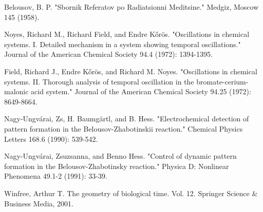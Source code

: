 \documentclass[3p, twocolumn]{elsarticle}
\begin{document}
\begin{thebibliography}{5}
 Belousov, B. P. "Sbornik Referatov po Radiatsionni Meditsine." Medgiz, Moscow 145 (1958).

 Noyes, Richard M., Richard Field, and Endre Kőrös. "Oscillations in chemical systems. I. Detailed mechanism in a system showing temporal oscillations." Journal of the American Chemical Society 94.4 (1972): 1394-1395.

 Field, Richard J., Endre Kőrös, and Richard M. Noyes. "Oscillations in chemical systems. II. Thorough analysis of temporal oscillation in the bromate-cerium-malonic acid system." Journal of the American Chemical Society 94.25 (1972): 8649-8664.


Nagy-Ungvárai, Zs, H. Baumgärtl, and B. Hess. "Electrochemical detection of pattern formation in the Belousov-Zhabotinskii reaction." Chemical Physics Letters 168.6 (1990): 539-542. 

Nagy-Ungvárai, Zsuzsanna, and Benno Hess. "Control of dynamic pattern formation in the Belousov-Zhabotinsky reaction." Physica D: Nonlinear Phenomena 49.1-2 (1991): 33-39.

 Winfree, Arthur T. The geometry of biological time. Vol. 12. Springer Science \& Business Media, 2001.

\end{thebibliography}
\end{document}
